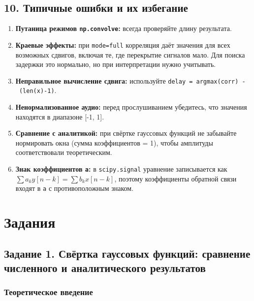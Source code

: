 \documentclass[12pt,a4paper,openany]{book}
\providecommand{\tightlist}{\setlength{\itemsep}{0pt}\setlength{\parskip}{0pt}}
\begin{document}
\subsection*{10. Типичные ошибки и их избегание}

\begin{enumerate}
\def\labelenumi{\arabic{enumi}.}
\tightlist
\item
  \textbf{Путаница режимов \texttt{np.\allowbreak{}convolve}:} всегда проверяйте длину результата.
\item
  \textbf{Краевые эффекты:} при \texttt{mode=\allowbreak{}\textquotesingle{}\allowbreak{}full\textquotesingle{}\allowbreak{}} корреляция даёт значения для всех возможных сдвигов, включая те, где перекрытие сигналов мало. Для поиска задержки это нормально, но при интерпретации нужно учитывать.
\item
  \textbf{Неправильное вычисление сдвига:} используйте \texttt{delay\ =\allowbreak{}\ argmax(\allowbreak{}corr)\ -\ (\allowbreak{}len(\allowbreak{}x)-1)}.
\item
  \textbf{Ненормализованное аудио:} перед прослушиванием убедитесь, что значения находятся в диапазоне {[}-1, 1{]}.
\item
  \textbf{Сравнение с аналитикой:} при свёртке гауссовых функций не забывайте нормировать окна (сумма коэффициентов = 1), чтобы амплитуды соответствовали теоретическим.
\item
  \textbf{Знак коэффициентов \texttt{a}:} в \texttt{scipy.\allowbreak{}signal} уравнение записывается как \(\sum a_k y[n-k] = \sum b_k x[n-k]\), поэтому коэффициенты обратной связи входят в \texttt{a} с противоположным знаком.
\end{enumerate}

\section*{Задания}

\subsection*{Задание 1. Свёртка гауссовых функций: сравнение численного и аналитического результатов}

\subsubsection*{Теоретическое введение}
\end{document}
